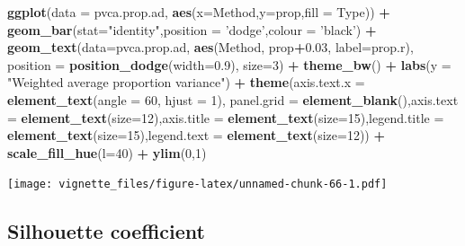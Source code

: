 \documentclass[]{book}
\newenvironment{Shaded}{\begin{snugshade}}{\end{snugshade}}
\newcommand{\KeywordTok}[1]{\textcolor[rgb]{0.13,0.29,0.53}{\textbf{#1}}}
\newcommand{\DataTypeTok}[1]{\textcolor[rgb]{0.13,0.29,0.53}{#1}}
\newcommand{\DecValTok}[1]{\textcolor[rgb]{0.00,0.00,0.81}{#1}}
\newcommand{\FloatTok}[1]{\textcolor[rgb]{0.00,0.00,0.81}{#1}}
\newcommand{\StringTok}[1]{\textcolor[rgb]{0.31,0.60,0.02}{#1}}
\newcommand{\OperatorTok}[1]{\textcolor[rgb]{0.81,0.36,0.00}{\textbf{#1}}}
\newcommand{\NormalTok}[1]{#1}
\begin{document}
\begin{Shaded}
\begin{Highlighting}[]
\KeywordTok{ggplot}\NormalTok{(}\DataTypeTok{data =}\NormalTok{ pvca.prop.ad, }\KeywordTok{aes}\NormalTok{(}\DataTypeTok{x=}\NormalTok{Method,}\DataTypeTok{y=}\NormalTok{prop,}\DataTypeTok{fill =}\NormalTok{ Type)) }\OperatorTok{+}\StringTok{ }\KeywordTok{geom_bar}\NormalTok{(}\DataTypeTok{stat=}\StringTok{"identity"}\NormalTok{,}\DataTypeTok{position =} \StringTok{'dodge'}\NormalTok{,}\DataTypeTok{colour =} \StringTok{'black'}\NormalTok{) }\OperatorTok{+}\StringTok{ }\KeywordTok{geom_text}\NormalTok{(}\DataTypeTok{data=}\NormalTok{pvca.prop.ad, }\KeywordTok{aes}\NormalTok{(Method, prop}\OperatorTok{+}\FloatTok{0.03}\NormalTok{, }\DataTypeTok{label=}\NormalTok{prop.r), }\DataTypeTok{position =} \KeywordTok{position_dodge}\NormalTok{(}\DataTypeTok{width=}\FloatTok{0.9}\NormalTok{), }\DataTypeTok{size=}\DecValTok{3}\NormalTok{) }\OperatorTok{+}\StringTok{ }\KeywordTok{theme_bw}\NormalTok{() }\OperatorTok{+}\StringTok{ }\KeywordTok{labs}\NormalTok{(}\DataTypeTok{y =} \StringTok{"Weighted average proportion variance"}\NormalTok{) }\OperatorTok{+}\StringTok{ }\KeywordTok{theme}\NormalTok{(}\DataTypeTok{axis.text.x =} \KeywordTok{element_text}\NormalTok{(}\DataTypeTok{angle =} \DecValTok{60}\NormalTok{, }\DataTypeTok{hjust =} \DecValTok{1}\NormalTok{), }\DataTypeTok{panel.grid =} \KeywordTok{element_blank}\NormalTok{(),}\DataTypeTok{axis.text =} \KeywordTok{element_text}\NormalTok{(}\DataTypeTok{size=}\DecValTok{12}\NormalTok{),}\DataTypeTok{axis.title =} \KeywordTok{element_text}\NormalTok{(}\DataTypeTok{size=}\DecValTok{15}\NormalTok{),}\DataTypeTok{legend.title =} \KeywordTok{element_text}\NormalTok{(}\DataTypeTok{size=}\DecValTok{15}\NormalTok{),}\DataTypeTok{legend.text =} \KeywordTok{element_text}\NormalTok{(}\DataTypeTok{size=}\DecValTok{12}\NormalTok{)) }\OperatorTok{+}\StringTok{ }\KeywordTok{scale_fill_hue}\NormalTok{(}\DataTypeTok{l=}\DecValTok{40}\NormalTok{) }\OperatorTok{+}\StringTok{ }\KeywordTok{ylim}\NormalTok{(}\DecValTok{0}\NormalTok{,}\DecValTok{1}\NormalTok{)}
\end{Highlighting}
\end{Shaded}

\texttt{[image: vignette\_files/figure-latex/unnamed-chunk-66-1.pdf]}

\subsection{Silhouette coefficient}\label{silhouette-coefficient}
\end{document}
